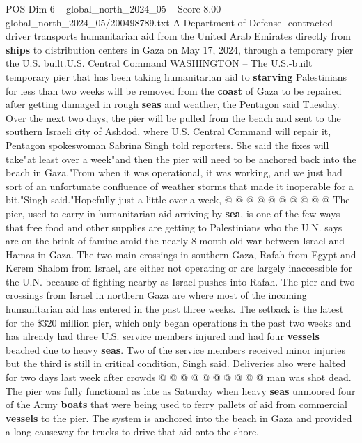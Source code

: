 \begin{textsample}{POS Dim 6 – global\_north\_2024\_05 – Score 8.00 – global\_north\_2024\_05/200498789.txt}  \label{ex:f6_pos_162}
A Department of Defense -contracted driver transports humanitarian aid from the United Arab Emirates directly from \textbf{ships} to distribution centers in Gaza on May 17, 2024, through a temporary pier the U.S. built.U.S.
Central Command WASHINGTON -- The U.S.-built temporary pier that has been taking humanitarian aid to \textbf{starving} Palestinians for less than two weeks will be removed from the \textbf{coast} of Gaza to be repaired after getting damaged in rough \textbf{seas} and weather, the Pentagon said Tuesday.
Over the next two days, the pier will be pulled from the beach and sent to the southern Israeli city of Ashdod, where U.S.
Central Command will repair it, Pentagon spokeswoman Sabrina Singh told reporters.
She said the fixes will take"at least over a week"and then the pier will need to be anchored back into the beach in Gaza."From when it was operational, it was working, and we just had sort of an unfortunate confluence of weather storms that made it inoperable for a bit,"Singh said."Hopefully just a little over a week, @ @ @ @ @ @ @ @ @ @ The pier, used to carry in humanitarian aid arriving by \textbf{sea}, is one of the few ways that free food and other supplies are getting to Palestinians who the U.N. says are on the brink of famine amid the nearly 8-month-old war between Israel and Hamas in Gaza.
The two main crossings in southern Gaza, Rafah from Egypt and Kerem Shalom from Israel, are either not operating or are largely inaccessible for the U.N. because of fighting nearby as Israel pushes into Rafah.
The pier and two crossings from Israel in northern Gaza are where most of the incoming humanitarian aid has entered in the past three weeks.
The setback is the latest for the \$320 million pier, which only began operations in the past two weeks and has already had three U.S. service members injured and had four \textbf{vessels} beached due to heavy \textbf{seas}.
Two of the service members received minor injuries but the third is still in critical condition, Singh said.
Deliveries also were halted for two days last week after crowds @ @ @ @ @ @ @ @ @ @ man was shot dead.
The pier was fully functional as late as Saturday when heavy \textbf{seas} unmoored four of the Army \textbf{boats} that were being used to ferry pallets of aid from commercial \textbf{vessels} to the pier.
The system is anchored into the beach in Gaza and provided a long causeway for trucks to drive that aid onto the shore.

\end{textsample}
